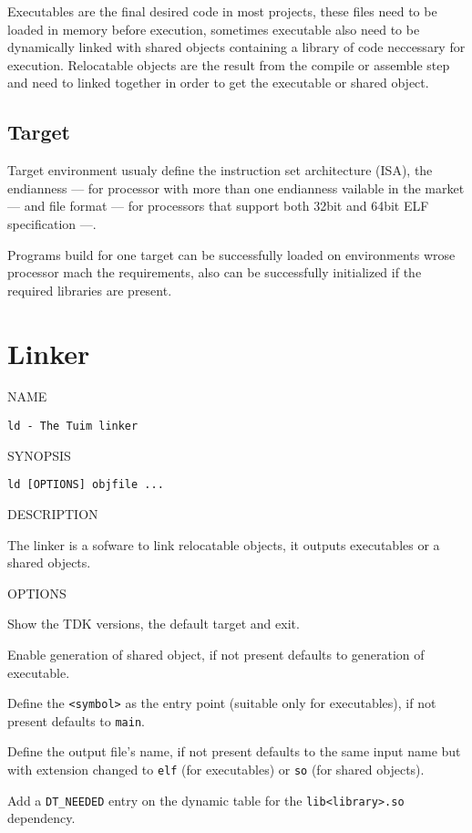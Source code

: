 \documentclass[
   article,                      %
   10pt,                         %
   openright,                    %
   oneside,                      %
   a4paper,                      %
   sumario = tradicional,        %
   english,                      %
   xcolor=table                  %
]{abntex2}
\begin{document}
Executables are the final desired code in most projects,
these files need to be loaded in memory before execution,
sometimes executable also need to be dynamically linked with shared objects
containing a library of code neccessary for execution.
Relocatable objects are the result from the compile or assemble step and
need to linked together in order to get the executable or shared object.

\subsection{Target}

Target environment usualy define the instruction set architecture
(ISA), the endianness
--- for processor with more than one endianness vailable in the market ---
and file format
--- for processors that support both 32bit and 64bit ELF specification ---.

Programs build for one target can be successfully loaded on environments wrose
processor mach the requirements,
also can be successfully initialized if the required libraries are present.

\newpage
\section{Linker}

\noindent NAME

\begin{lstlisting}[style=bash]
ld - The Tuim linker
\end{lstlisting}

\noindent SYNOPSIS

\begin{lstlisting}[style=bash]
ld [OPTIONS] objfile ...
\end{lstlisting}

\noindent DESCRIPTION

The linker is a sofware to link relocatable objects,
it outputs executables or a shared objects.

\noindent OPTIONS

\begin{description}[style=multiline,leftmargin=5cm]
   \item[\texttt{{-}{-}version}]
   Show the TDK versions, the default target and exit.
   \item[\texttt{{-}{-}shared}]
   Enable generation of shared object,
   if not present defaults to generation of executable.
   \item[\texttt{-e <symbol>}]
   Define the \texttt{<symbol>} as the entry point
   (suitable only for executables),
   if not present defaults to \texttt{main}.
   \item[\texttt{-o <name>}]
   Define the output file's name,
   if not present defaults to the same input name but with
   extension changed to \texttt{elf} (for executables)
   or \texttt{so} (for shared objects).
   \item[\texttt{-l<library>}]
   Add a \texttt{DT\_NEEDED} entry on the dynamic table for the
   \texttt{lib<library>.so} dependency.
\end{description}
\end{document}
